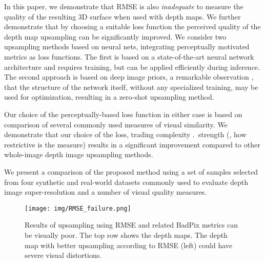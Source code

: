 In this paper, we demonstrate that RMSE is also \emph{inadequate} to measure the quality of the resulting 3D surface when used with depth maps.
We further demonstrate that by choosing a suitable loss function the perceived quality of the depth map upsampling can be significantly improved. We consider two upsampling methods based on neural nets, integrating perceptually motivated metrics as loss functions. The first is based on a state-of-the-art neural network architecture and requires training, but can be applied efficiently during inference.
The second approach is based on deep image priors, a remarkable observation \cite{Ulyanov_2018_CVPR}, that the structure of the network itself, without any specialized training, may be used for optimization, resulting in a zero-shot upsampling method.

Our choice of the perceptually-based loss function in either case is based on comparison of several commonly used measures of visual similarity.  We demonstrate that our choice of the loss, trading complexity \vs.\ strength (\ie, how restrictive is the measure) results in a significant improvement compared to other whole-image depth image upsampling methods.

We present a comparison of the proposed method using a set of samples selected from four synthetic and real-world datasets commonly used to evaluate depth image super-resolution and a number of visual quality measures. 

\begingroup

\begin{figure}[t]
\begin{center}
        \texttt{[image: img/RMSE\_failure.png]}

\caption{Results of upsampling using RMSE and related BadPix metrics can be visually poor. 
The top row shows the depth maps. The depth map with better upsampling  according to RMSE (left) could have severe visual distortions.
}
\label{fig:datasets}
\end{center}
\end{figure}
\endgroup



